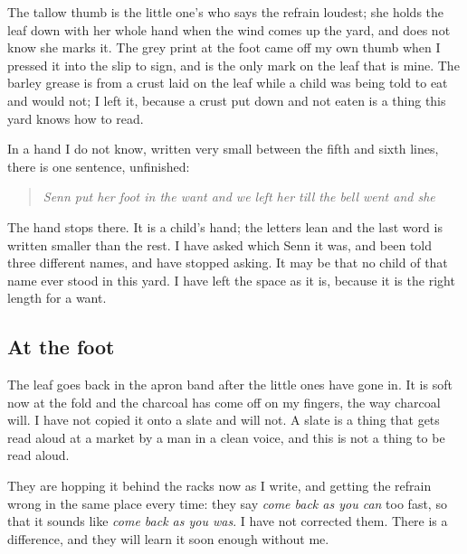 \documentclass{design/chronicle}
\begin{document}
The tallow thumb is the little one’s who says the refrain loudest; she holds the leaf down with her whole hand when the wind comes up the yard, and does not know she marks it. The grey print at the foot came off my own thumb when I pressed it into the slip to sign, and is the only mark on the leaf that is mine. The barley grease is from a crust laid on the leaf while a child was being told to eat and would not; I left it, because a crust put down and not eaten is a thing this yard knows how to read.

In a hand I do not know, written very small between the fifth and sixth lines, there is one sentence, unfinished:

\begin{quote}\itshape Senn put her foot in the want and we left her till the bell went and she\end{quote}

The hand stops there. It is a child’s hand; the letters lean and the last word is written smaller than the rest. I have asked which Senn it was, and been told three different names, and have stopped asking. It may be that no child of that name ever stood in this yard. I have left the space as it is, because it is the right length for a want.

\subsection*{At the foot}

The leaf goes back in the apron band after the little ones have gone in. It is soft now at the fold and the charcoal has come off on my fingers, the way charcoal will. I have not copied it onto a slate and will not. A slate is a thing that gets read aloud at a market by a man in a clean voice, and this is not a thing to be read aloud.

They are hopping it behind the racks now as I write, and getting the refrain wrong in the same place every time: they say \emph{come back as you can} too fast, so that it sounds like \emph{come back as you was}. I have not corrected them. There is a difference, and they will learn it soon enough without me.
\end{document}

